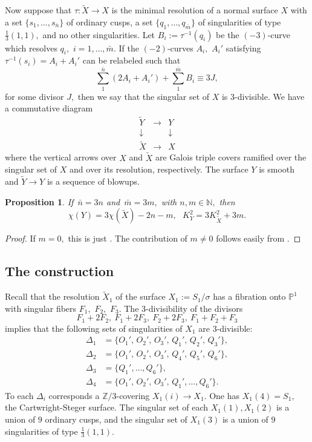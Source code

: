 \documentclass[10pt,a4paper]{article}
\newcommand{\ZZ}{\mathbb{Z}}
\newtheorem{proposition}[theorem]{Proposition}
\begin{document}
Now suppose that $\tau:\tilde X\rightarrow X$ is the minimal resolution of a normal surface $X$ with a set
$\{s_1,\ldots,s_{\bar n}\}$ of ordinary cusps, a set $\{q_1,\ldots,q_{\bar m}\}$ of singularities of type $\frac{1}{3}(1,1),$
and no other singularities.
Let $B_i:=\tau^{-1}(q_i)$ be the $(-3)$-curve which resolves $q_i,$ $i=1,\ldots,\bar m.$
If the $(-2)$-curves $A_i,$ $A_i'$ satisfying $\tau^{-1}(s_i)=A_i+A_i'$ can be
relabeled such that
\[\sum_1^{\bar n} (2A_i+A_i')+\sum_1^{\bar m} B_i\equiv 3J,\]
for some divisor $J,$ then we say that the singular set of $X$ is $3$-divisible.
We have a commutative diagram
\[
\begin{array}{ccc}
\tilde Y & \longrightarrow & Y\\
\downarrow &  & \downarrow\\
\tilde X & \longrightarrow & X
\end{array}
\]
where the vertical arrows over $X$ and $\tilde X$ are Galois triple covers ramified over the singular set of $X$ and
over its resolution, respectively. The surface $Y$ is smooth and $\tilde Y\to Y$ is a sequence of blowups.

\begin{proposition}\label{invariants}
If\ $\bar n=3n$ and\ $\bar m=3m,$ with $n,m\in\mathbb N,$ then
\[
\chi(Y)=3\chi(\tilde X)-2n-m, \ \ \ K_{Y}^{2}=3K_{\tilde X}^{2}+3m.
\]
\end{proposition}

\begin{proof}
If $m=0,$ this is just \cite[Lemma 2.2.4]{Tan1}.
The contribution of $m\ne 0$ follows easily from \cite[Section 1.3]{Tan1}.
\end{proof}


\subsection{The construction \label{sec:Geometrie}}

Recall that the resolution $\tilde X_1$ of the surface $X_1:=S_1/\sigma$ has a fibration onto $\mathbb P^1$
with singular fibers $F_1,$ $F_2,$ $F_3.$ The $3$-divisibility of the divisors
\[
F_1+2F_2,\ F_1+2F_3,\ F_2+2F_3,\ F_1+F_2+F_3
\]
implies that the following sets of singularities of $X_1$ are $3$-divisible:
\begin{align*}
\Delta_1&=\{O_1',\, O_2',\, O_3',\, Q_1',\, Q_2',\, Q_3'\},\\
\Delta_2&=\{O_1',\, O_2',\, O_3',\, Q_4',\, Q_5',\, Q_6'\},\\
\Delta_3&=\{Q_1', \ldots, Q_6'\},\\
\Delta_4&=\{O_1',\, O_2',\, O_3',\, Q_1', \ldots, Q_6'\}.
\end{align*}
To each $\Delta_i$ corresponds a $\ZZ/3$-covering $X_1(i)\to X_1.$
One has $X_1(4)=S_1,$ the Cartwright-Steger surface. 
The singular set of each $X_1(1), X_1(2)$ is a union of $9$ ordinary cusps, and
the singular set of $X_1(3)$ is a union of $9$ singularities of type $\frac{1}{3}(1,1).$
\end{document}

